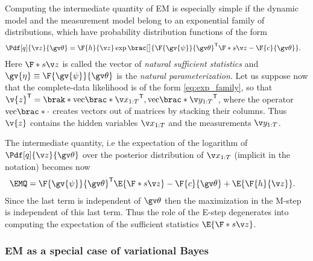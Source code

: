 Computing the intermediate quantity of EM is especially simple
if the dynamic model and the measurement model belong to an exponential
family of distributions, which have probability distribution functions of the form 
\begin{align}
	\Pdf[q]{\z}{\Th}&=\F{h}{\z}\exp\brac[\big]{ \F{\gv{\psi}}{\Th}^\tr \F*{s}{\z}-\F{c}{\Th}}.
	\label{eq:exp_family}
\end{align}
Here $\F*{s}{\z}$ is called the vector of \emph{natural sufficient statistics} and
$\gv{\eta}\equiv \F{\gv{\psi}}{\Th}$ is the \emph{natural parameterization}.
Let us suppose now that the complete-data likelihood is of the form \eqref{eq:exp_family}, so
that $\v{z}^\tr=\brak*{\mathrm{vec}\brac*{\X}^\tr,\mathrm{vec}\brac*{\Y}^\tr}$, where the operator $\mathrm{vec}\brac*{\cdot}$
creates vectors out of matrices by stacking their columns. Thus $\v{z}$ 
contains the hidden variables $\X$ and the measurements $\Y$. 

The intermediate quantity, i.e the expectation of the logarithm of $\Pdf[q]{\z}{\Th}$ over the posterior distribution of 
$\X$ (implicit in the notation) becomes now
\begin{align}
	\EMQ&=	\F{\gv{\psi}}{\Th}^\tr \E{\F*{s}{\z}}-\F{c}{\Th}+\E{\F{h}{\z}}.
\end{align}
Since the last term is independent of $\Th$ then the maximization in the M-step
is independent of this last term. Thus the role of the E-step degenerates into computing the
expectation of the sufficient statistics $\E{\F*{s}{\z}}$.

\begin{example}
\end{example}




\subsubsection*{EM as a special case of variational Bayes}%


